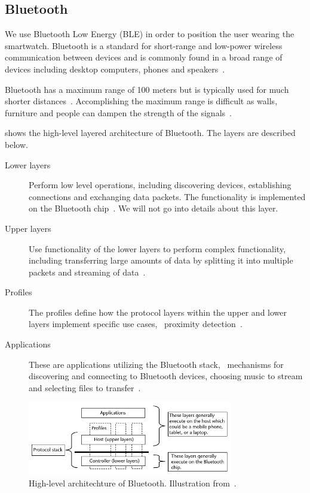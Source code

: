 \subsection{Bluetooth}
\label{sec:analysis:bluetooth}

We use Bluetooth Low Energy (BLE) in order to position the user wearing the smartwatch. Bluetooth is a standard for short-range and low-power wireless communication between devices and is commonly found in a broad range of devices including desktop computers, phones and speakers~\cite{gupta2013inside}.

Bluetooth has a maximum range of 100 meters but is typically used for much shorter distances~\cite[p. 20]{gupta2013inside}. Accomplishing the maximum range is difficult as walls, furniture and people can dampen the strength of the signals~\cite{faragher2014analysis}.

 shows the high-level layered architecture of Bluetooth. The layers are described below.

\begin{description}
\item[Lower layers] Perform low level operations, including discovering devices, establishing connections and exchanging data packets. The functionality is implemented on the Bluetooth chip~\cite[pp. 21-22]{gupta2013inside}. We will not go into details about this layer.
\item[Upper layers] Use functionality of the lower layers to perform complex functionality, including transferring large amounts of data by splitting it into multiple packets and streaming of data~\cite[p. 22]{gupta2013inside}.
\item[Profiles] The profiles define how the protocol layers within the upper and lower layers implement specific use cases, \eg~proximity detection~\cite[p. 22]{gupta2013inside}.
\item[Applications] These are applications utilizing the Bluetooth stack, \eg~mechanisms for discovering and connecting to Bluetooth devices, choosing music to stream and selecting files to transfer~\cite[p. 22]{gupta2013inside}.
\end{description}

\begin{figure}[!htb]
\centering
\includegraphics[width=0.8\textwidth]{images/bluetooth-architecture}
\caption{High-level architechture of Bluetooth. Illustration from~\cite[p. 22]{gupta2013inside}.}
\label{fig:analysis:bluetooth:highlevel-architecture}
\end{figure}

